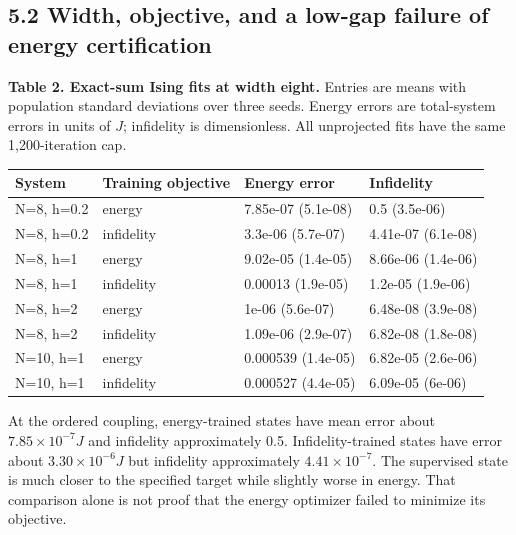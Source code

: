 \documentclass[
  11pt,
  a4paper,
]{article}
\begin{document}
\hypertarget{width-objective-and-a-low-gap-failure-of-energy-certification}{%
\subsection{5.2 Width, objective, and a low-gap failure of energy
certification}\label{width-objective-and-a-low-gap-failure-of-energy-certification}}

\par\medskip
\noindent\begin{minipage}{\linewidth}

\textbf{Table 2. Exact-sum Ising fits at width eight.} Entries are means
with population standard deviations over three seeds. Energy errors are
total-system errors in units of \(J\); infidelity is dimensionless. All
unprojected fits have the same 1,200-iteration cap.

\begin{tabular}{@{}llll@{}}
\toprule\noalign{}
System & Training objective & Energy error & Infidelity \\
\midrule\noalign{}


N=8, h=0.2 & energy & 7.85e-07 (5.1e-08) & 0.5 (3.5e-06) \\
N=8, h=0.2 & infidelity & 3.3e-06 (5.7e-07) & 4.41e-07 (6.1e-08) \\
N=8, h=1 & energy & 9.02e-05 (1.4e-05) & 8.66e-06 (1.4e-06) \\
N=8, h=1 & infidelity & 0.00013 (1.9e-05) & 1.2e-05 (1.9e-06) \\
N=8, h=2 & energy & 1e-06 (5.6e-07) & 6.48e-08 (3.9e-08) \\
N=8, h=2 & infidelity & 1.09e-06 (2.9e-07) & 6.82e-08 (1.8e-08) \\
N=10, h=1 & energy & 0.000539 (1.4e-05) & 6.82e-05 (2.6e-06) \\
N=10, h=1 & infidelity & 0.000527 (4.4e-05) & 6.09e-05 (6e-06) \\
\bottomrule
\end{tabular}
\end{minipage}\par\medskip


At the ordered coupling, energy-trained states have mean error about
\(7.85\times10^{-7}J\) and infidelity approximately 0.5.
Infidelity-trained states have error about \(3.30\times10^{-6}J\) but
infidelity approximately \(4.41\times10^{-7}\). The supervised state is
much closer to the specified target while slightly worse in energy. That
comparison alone is not proof that the energy optimizer failed to
minimize its objective.
\end{document}
